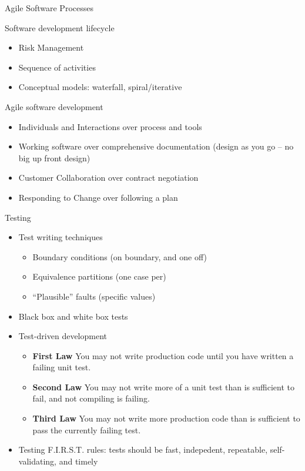 \documentclass{beamer}
\begin{document}
\begin{frame}[fragile]{Agile Software Processes}


Software development lifecycle
\begin{itemize}
\item Risk Management
\item Sequence of activities
\item Conceptual models: waterfall, spiral/iterative
\end{itemize}

Agile software development
\begin{itemize}
\item Individuals and Interactions over process and tools
\item Working software over comprehensive documentation (design as you go -- no big up front design)
\item Customer Collaboration over contract negotiation
\item Responding to Change over following a plan
\end{itemize}

\end{frame}


\begin{frame}[fragile]{Testing}


\begin{itemize}
\item Test writing techniques
\begin{itemize}
\item Boundary conditions (on boundary, and one off)
\item Equivalence partitions (one case per)
\item ``Plausible'' faults (specific values)
\end{itemize}
\item Black box and white box tests
\item Test-driven development
\begin{itemize}
\item {\bf First Law} You may not write production code until you have written a failing unit test.
\item {\bf Second Law} You may not write more of a unit test than is sufficient to fail, and not compiling is failing.
\item {\bf Third Law} You may not write more production code than is sufficient to pass the currently failing test.
\end{itemize}
\item Testing F.I.R.S.T. rules: tests should be fast, indepedent, repeatable, self-validating, and timely
\end{itemize}


\end{frame}
\end{document}
